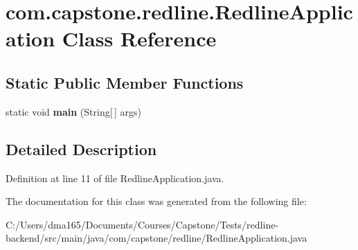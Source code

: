 \hypertarget{classcom_1_1capstone_1_1redline_1_1_redline_application}{}\section{com.\+capstone.\+redline.\+Redline\+Application Class Reference}
\label{classcom_1_1capstone_1_1redline_1_1_redline_application}
\subsection*{Static Public Member Functions}
\begin{DoxyCompactItemize}
\item 
\mbox{\label{classcom_1_1capstone_1_1redline_1_1_redline_application_af2bd7772f554384c47a4a37d2e15579e}} 
static void {\bfseries main} (String\mbox{[}$\,$\mbox{]} args)
\end{DoxyCompactItemize}


\subsection{Detailed Description}


Definition at line 11 of file Redline\+Application.\+java.



The documentation for this class was generated from the following file\+:\begin{DoxyCompactItemize}
\item 
C\+:/\+Users/dma165/\+Documents/\+Courses/\+Capstone/\+Tests/redline-\/backend/src/main/java/com/capstone/redline/Redline\+Application.\+java\end{DoxyCompactItemize}
